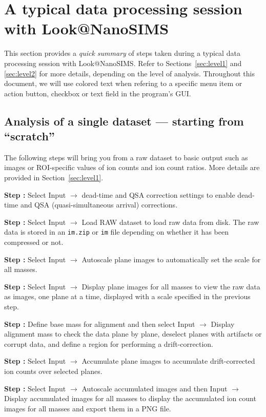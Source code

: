 \documentclass[a4paper, 11pt]{article}
\newcommand{\ttt}[1]{\texttt{#1}}
\newcommand{\lans}[1]{{\color{magenta}#1}}
\newcommand{\lanscb}[1]{{\color{darkgreen}#1}}
\newcommand{\lanstf}[1]{{\color{cyan}#1}}
\newcommand\ra{\rightarrow}
\newcounter{step}
\newcommand\s{\addtocounter{step}{1}\vskip5pt\noindent\textbf{Step \thestep:}{ }}
\begin{document}
\clearpage

\section{A typical data processing session with Look@NanoSIMS}

This section provides a \emph{quick summary} of steps taken during a typical data processing session with Look@NanoSIMS. Refer to Sections~\ref{sec:level1} and \ref{sec:level2} for more details, depending on the level of analysis. Throughout this document, we will use colored text when refering to a specific \lans{menu item or action button}, \lanscb{checkbox} or \lanstf{text field} in the program's GUI.


\subsection{Analysis of a single dataset --- starting from ``scratch''}
\label{sec:analysis_from_scratch}
\setcounter{step}{0}

The following steps will bring you from a raw dataset to basic output such as images or ROI-specific values of ion counts and ion count ratios. More details are provided in Section~\ref{sec:level1}.

\s Select \lans{Input} $\ra$ \lans{dead-time and QSA correction settings} to enable dead-time and QSA (quasi-simultaneous arrival) corrections.

\s Select \lans{Input} $\ra$ \lans{Load RAW dataset} to load raw data from disk. The raw data is stored in an \ttt{im.zip} or \ttt{im} file depending on whether it has been compressed or not.

\s Select \lans{Input} $\ra$ \lans{Autoscale plane images} to automatically set the scale for all masses. 

\s Select \lans{Input} $\ra$ \lans{Display plane images for all masses} to view the raw data as images, one plane at a time, displayed with a scale specified in the previous step. 

\s Define \lanstf{base mass for alignment} and then select \lans{Input} $\ra$ \lans{Display alignment mass} to check the data plane by plane, \lanscb{deselect planes} with artifacts or corrupt data, and \lans{define a region} for performing a drift-correction. 

\s Select \lans{Input} $\ra$ \lans{Accumulate plane images} to accumulate drift-corrected ion counts over selected planes.  

\s Select \lans{Input} $\ra$ \lans{Autoscale accumulated images} and then \lans{Input} $\ra$ \lans{Display accumulated images for all masses} to display the accumulated ion count images for all masses and export them in a PNG file.
\end{document}
